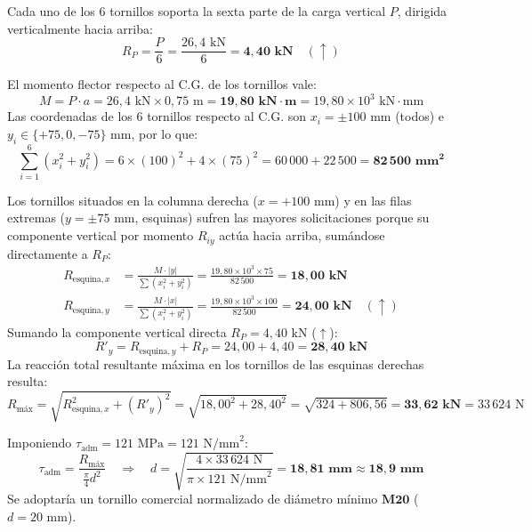 {
Cada uno de los 6 tornillos soporta la sexta parte de la carga vertical $P$, dirigida verticalmente hacia arriba:
\begin{equation*}
    R_P = \frac{P}{6} = \frac{26{,}4\text{ kN}}{6} = \mathbf{4{,}40\text{ kN}} \quad (\uparrow)
\end{equation*}

El momento flector respecto al C.G. de los tornillos vale:
\begin{equation*}
    M = P \cdot a = 26{,}4\text{ kN} \times 0{,}75\text{ m} = \mathbf{19{,}80\text{ kN}\cdot\text{m}} = 19{,}80 \times 10^3\text{ kN}\cdot\text{mm}
\end{equation*}
Las coordenadas de los 6 tornillos respecto al C.G. son $x_i = \pm 100\text{ mm}$ (todos) e $y_i \in \{+75, 0, -75\}\text{ mm}$, por lo que:
\begin{equation*}
    \sum_{i=1}^{6}\left(x_i^2 + y_i^2\right) = 6 \times (100)^2 + 4 \times (75)^2 = 60\,000 + 22\,500 = \mathbf{82\,500\text{ mm}^2}
\end{equation*}

Los tornillos situados en la columna derecha ($x = +100\text{ mm}$) y en las filas extremas ($y = \pm 75\text{ mm}$, esquinas) sufren las mayores solicitaciones porque su componente vertical por momento $R_{iy}$ actúa hacia arriba, sumándose directamente a $R_P$:
\begin{align*}
    R_{\text{esquina},x} &= \frac{M \cdot |y|}{\sum(x_i^2 + y_i^2)} = \frac{19{,}80 \times 10^3 \times 75}{82\,500} = \mathbf{18{,}00\text{ kN}} \\
    R_{\text{esquina},y} &= \frac{M \cdot |x|}{\sum(x_i^2 + y_i^2)} = \frac{19{,}80 \times 10^3 \times 100}{82\,500} = \mathbf{24{,}00\text{ kN}} \quad (\uparrow)
\end{align*}
Sumando la componente vertical directa $R_P = 4{,}40\text{ kN}$ ($\uparrow$):
\begin{equation*}
    R'_y = R_{\text{esquina},y} + R_P = 24{,}00 + 4{,}40 = \mathbf{28{,}40\text{ kN}}
\end{equation*}
La reacción total resultante máxima en los tornillos de las esquinas derechas resulta:
\begin{equation*}
    R_{\text{máx}} = \sqrt{R_{\text{esquina},x}^2 + (R'_y)^2} = \sqrt{18{,}00^2 + 28{,}40^2} = \sqrt{324 + 806{,}56} = \mathbf{33{,}62\text{ kN}} = 33\,624\text{ N}
\end{equation*}

Imponiendo $\tau_{\text{adm}} = 121\text{ MPa} = 121\text{ N/mm}^2$:
\begin{equation*}
    \tau_{\text{adm}} = \frac{R_{\text{máx}}}{\frac{\pi}{4}d^2} \quad \Longrightarrow \quad d = \sqrt{\frac{4 \times 33\,624\text{ N}}{\pi \times 121\text{ N/mm}^2}} = \mathbf{18{,}81\text{ mm}} \approx \mathbf{18{,}9\text{ mm}}
\end{equation*}
Se adoptaría un tornillo comercial normalizado de diámetro mínimo $\mathbf{M20}$ ($d = 20\text{ mm}$).
}

